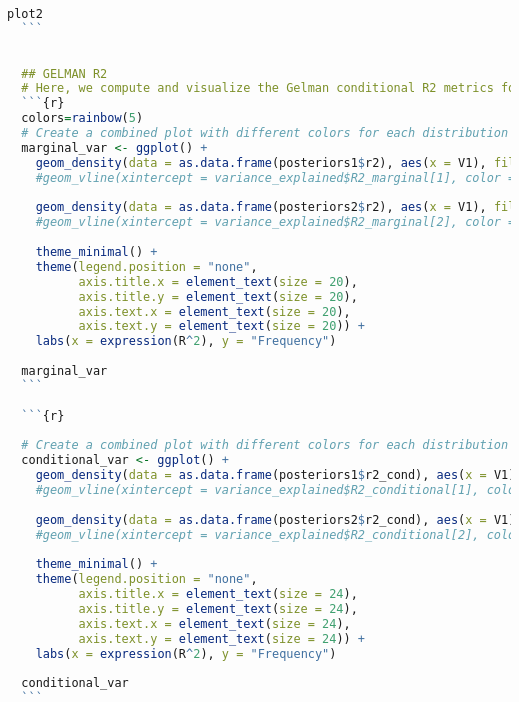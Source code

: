 \begin{lstlisting}[language=R, caption=Usage of the Bayesian Importance package with plots and examples.]
  plot2
  ```
  
  
  ## GELMAN R2
  # Here, we compute and visualize the Gelman conditional R2 metrics for each model. This metric gives insight into the proportion of variance explained by the fixed effects in the models.
  ```{r}
  colors=rainbow(5)
  # Create a combined plot with different colors for each distribution
  marginal_var <- ggplot() +
    geom_density(data = as.data.frame(posteriors1$r2), aes(x = V1), fill = colors[1], alpha = 0.5) +
    #geom_vline(xintercept = variance_explained$R2_marginal[1], color = colors[1], linetype = "dashed") +
    
    geom_density(data = as.data.frame(posteriors2$r2), aes(x = V1), fill = colors[2], alpha = 0.5) +
    #geom_vline(xintercept = variance_explained$R2_marginal[2], color = colors[2], linetype = "dashed") +
    
    theme_minimal() +
    theme(legend.position = "none",
          axis.title.x = element_text(size = 20),
          axis.title.y = element_text(size = 20),
          axis.text.x = element_text(size = 20),
          axis.text.y = element_text(size = 20)) +
    labs(x = expression(R^2), y = "Frequency")
  
  marginal_var
  ```
  
  ```{r}
  
  # Create a combined plot with different colors for each distribution
  conditional_var <- ggplot() +
    geom_density(data = as.data.frame(posteriors1$r2_cond), aes(x = V1), fill = colors[1], alpha = 0.5) +
    #geom_vline(xintercept = variance_explained$R2_conditional[1], color = colors[1], linetype = "dashed") +
    
    geom_density(data = as.data.frame(posteriors2$r2_cond), aes(x = V1), fill = colors[2], alpha = 0.5) +
    #geom_vline(xintercept = variance_explained$R2_conditional[2], color = colors[2], linetype = "dashed") +
    
    theme_minimal() +
    theme(legend.position = "none",
          axis.title.x = element_text(size = 24),
          axis.title.y = element_text(size = 24),
          axis.text.x = element_text(size = 24),
          axis.text.y = element_text(size = 24)) +
    labs(x = expression(R^2), y = "Frequency")
  
  conditional_var
  ```
\end{lstlisting}

